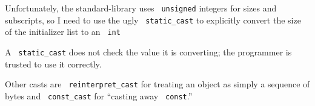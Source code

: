 \documentclass[11pt]{article}
\let\OldTexttt\texttt
\renewcommand{\texttt}[1]{\OldTexttt{\color{MidnightBlue} #1}}
\begin{document}
Unfortunately, the standard-library uses \texttt{unsigned} integers for sizes and subscripts, so I need
to use the ugly \texttt{static\_cast} to explicitly convert the size of the initializer list to an \texttt{int}

A \texttt{static\_cast} does not check the value it is converting; the programmer is trusted to use it
correctly.

Other casts are \texttt{reinterpret\_cast} for treating an object as simply a sequence of bytes and
\texttt{const\_cast} for ``casting away \texttt{const}.''
\end{document}
